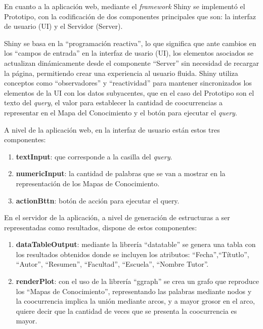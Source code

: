 \documentclass[
  12pt,
  openany]{book}
\begin{document}
En cuanto a la aplicación web, mediante el \emph{framework} Shiny se implementó el Prototipo, con la codificación de dos componentes principales que son: la interfaz de usuario (UI) y el Servidor (Server).

Shiny se basa en la ``programación reactiva'', lo que significa que ante cambios en los ``campos de entrada'' en la interfaz de usario (UI), los elementos asociados se actualizan dinámicamente desde el componente ``Server'' sin necesidad de recargar la página, permitiendo crear una experiencia al usuario fluida. Shiny utiliza conceptos como ``observadores'' y ``reactividad'' para mantener sincronizados los elementos de la UI con los datos subyacentes, que en el caso del Prototipo son el texto del \emph{query}, el valor para establecer la cantidad de coocurrencias a representar en el Mapa del Conocimiento y el botón para ejecutar el \emph{query}.

\hfill\break
A nivel de la aplicación web, en la interfaz de usuario están estos tres componentes:

\begin{enumerate}
\def\labelenumi{\arabic{enumi}.}
\item
  \textbf{textInput}: que corresponde a la casilla del \emph{query}.
\item
  \textbf{numericInput}: la cantidad de palabras que se van a mostrar en la representación de los Mapas de Conocimiento.
\item
  \textbf{actionBttn}: botón de acción para ejecutar el query.
\end{enumerate}

En el servidor de la aplicación, a nivel de generación de estructuras a ser representadas como resultados, dispone de estos componentes:

\begin{enumerate}
\def\labelenumi{\arabic{enumi}.}
\item
  \textbf{dataTableOutput}: mediante la librería ``datatable'' \citep{DT} se genera una tabla con los resultados obtenidos donde se incluyen los atributos: ``Fecha'',``Títutlo'', ``Autor'', ``Resumen'', ``Facultad'', ``Escuela'', ``Nombre Tutor''.
\item
  \textbf{renderPlot}: con el uso de la librería ``ggraph'' \citep{ggraph} se crea un grafo que reproduce los ``Mapas de Conocimiento'', representando las palabras mediante nodos y la coocurrencia implica la unión mediante arcos, y a mayor grosor en el arco, quiere decir que la cantidad de veces que se presenta la coocurrencia es mayor.
\end{enumerate}
\end{document}
